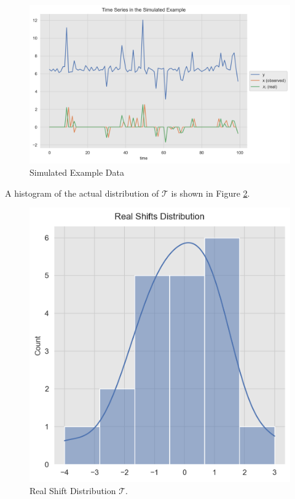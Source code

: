 \documentclass[11pt]{amsart}
\begin{document}
\begin{center}
\begin{figure}
\includegraphics[scale=0.5]{images/simulated_example.png}
\caption{Simulated Example Data}
\label{fig:simulated_example}
\end{figure}
\end{center}

A histogram of the actual distribution of $\mathcal{T}$ is shown in Figure \ref{fig:real_shifts}.

\begin{center}
\begin{figure}
\includegraphics[scale=0.5]{images/real_shifts.png}
\caption{Real Shift Distribution $\mathcal{T}$.}
\label{fig:real_shifts}
\end{figure}
\end{center}
\end{document}
